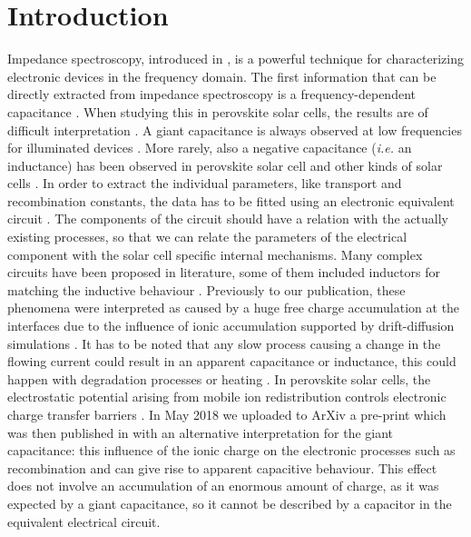 
\section{Introduction}
	Impedance spectroscopy, introduced in , is a powerful technique for characterizing electronic devices in the frequency domain.
	The first information that can be directly extracted from impedance spectroscopy is a frequency\hyp{}dependent capacitance \cite{Brus2016}.
	When studying this in perovskite solar cells, the results are of difficult interpretation \cite{Almora2018,Guillen2014}.
	A giant capacitance is always observed at low frequencies for illuminated devices \cite{Juarez-Perez2014,Kim2015c}.
	More rarely, also a negative capacitance (\textsl{i.e.} an inductance) has been observed in perovskite solar cell \cite{Ghahremanirad2017,Guerrero2016,Sanchez2014} and other kinds of solar cells \cite{Mora-Sero2006,Knapp2015}.
	In order to extract the individual parameters, like transport and recombination constants, the data has to be fitted using an electronic equivalent circuit \cite{Jamnik2001}.
	The components of the circuit should have a relation with the actually existing processes, so that we can relate the parameters of the electrical component with the solar cell specific internal mechanisms.
	Many complex circuits have been proposed in literature, some of them included inductors for matching the inductive behaviour \cite{Almora2018,Ghahremanirad2017,Guerrero2016}.
	Previously to our publication, these phenomena were interpreted as caused by a huge free charge accumulation at the interfaces due to the influence of ionic accumulation \cite{Guerrero2016,Zarazua2016a} supported by drift\hyp{}diffusion simulations \cite{Garcia-Rosell2018,Lopez-Varo2018}.
	It has to be noted that any slow process causing a change in the flowing current could result in an apparent capacitance or inductance, this could happen with degradation processes or heating \cite{Knapp2015}.
	In perovskite solar cells, the electrostatic potential arising from mobile ion redistribution controls electronic charge transfer barriers \cite{Tress2016,Pockett2017}.
	In May 2018 we uploaded to ArXiv a pre-print which was then published in  with an alternative interpretation for the giant capacitance: this influence of the ionic charge on the electronic processes such as recombination and can give rise to apparent capacitive behaviour.
	This effect does not involve an accumulation of an enormous amount of charge, as it was expected by a giant capacitance, so it cannot be described by a capacitor in the equivalent electrical circuit.
